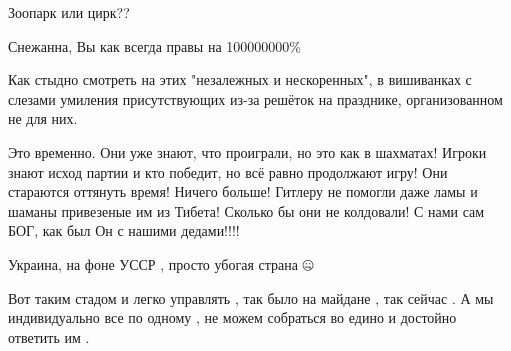 \begin{itemize}
Зоопарк или цирк??

 
Снежанна, Вы как всегда правы на 100000000\%

 

Как стыдно смотреть на этих "незалежных и нескоренных", в вишиванках с слезами
умиления присутствующих из-за решёток на празднике, организованном не для них.


 

Это временно. Они уже знают, что проиграли, но это как в шахматах! Игроки знают
исход партии и кто победит, но всё равно продолжают игру! Они стараются
оттянуть время! Ничего больше! Гитлеру не помогли даже ламы и шаманы привезеные
им из Тибета! Сколько бы они не колдовали! С нами сам БОГ, как был Он с нашими
дедами!!!!

 
Украина, на фоне УССР , просто убогая страна 🤐

 

Вот таким стадом и легко управлять , так было на майдане , так сейчас . А мы
индивидуально все по одному , не можем собраться во едино и достойно ответить
им .


 

\end{itemize}
